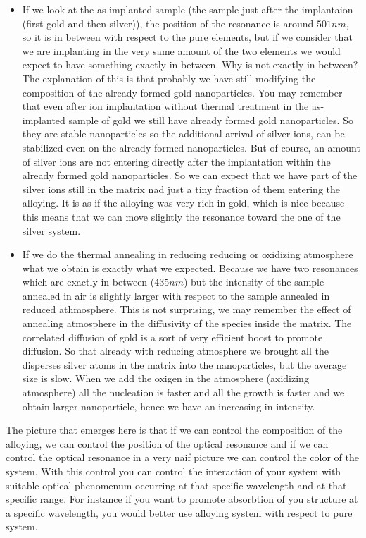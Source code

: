 \documentclass[../main/main.tex]{subfiles}
\begin{document}
\begin{itemize}
\item If we look at the as-implanted sample (the sample just after the implantaion (first gold and then silver)), the position of the resonance is around \( 501nm \), so it is in between with respect to the pure elements, but if we consider that we are implanting in the very same amount of the two elements we would expect to have something exactly in between. Why is not exactly in between? The explanation of this is that probably we have still modifying the composition of the already formed gold nanoparticles. You may remember that even after ion implantation without thermal treatment in the as-implanted sample of gold we still have already formed gold nanoparticles. So they are stable nanoparticles so the additional arrival of silver ions, can be stabilized even on the already formed nanoparticles. But of course, an amount of silver ions are not entering directly after the implantation within the already formed gold nanoparticles.
So we can expect that we have part of the silver ions still in the matrix nad just a tiny fraction of them entering the alloying. It is as if the alloying was very rich in gold, which is nice because this means that we can move slightly the resonance toward the one of the silver system.

\item If we do the thermal annealing in reducing reducing or oxidizing atmosphere what we obtain is exactly what we expected. Because we have two resonances which are exactly in between (\( 435nm \)) but the intensity of the sample annealed in air is slightly larger with respect to the sample annealed in reduced athmosphere. This is not surprising, we may remember the effect of annealing atmosphere in the diffusivity of the species inside the matrix. The correlated diffusion of gold is a sort of very efficient boost to promote diffusion. So that already with reducing atmosphere we brought all the disperses silver atoms in the matrix into the nanoparticles, but the average size is slow. When we add the oxigen in the atmosphere (axidizing atmosphere) all the nucleation is faster and all the growth is faster and we obtain larger nanoparticle, hence we have an increasing in intensity.
\end{itemize}
The picture that emerges here is that if we can control the composition of the alloying, we can control the position of the optical resonance and if we can control the optical resonance in a very naif picture we can control the color of the system.
With this control you can control the interaction of your system with suitable optical phenomenum occurring at that specific wavelength and at that specific range.
For instance if you want to promote absorbtion of you structure at a specific wavelength, you would better use alloying system with respect to pure system.
\end{document}
